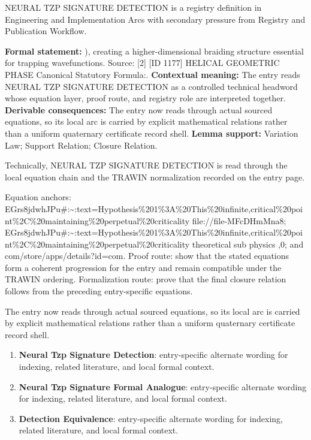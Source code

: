 
\begingroup\small
{}
NEURAL TZP SIGNATURE DETECTION is a registry definition in Engineering and Implementation Arcs with secondary pressure from Registry and Publication Workflow.

\begingroup\footnotesize\setlength{\emergencystretch}{3em}\sloppy
\textbf{Formal statement:} ), creating a higher-dimensional braiding structure essential for trapping wavefunctions. Source: [2] [ID 1177] HELICAL GEOMETRIC PHASE Canonical Statutory Formula:. \textbf{Contextual meaning:} The entry reads NEURAL TZP SIGNATURE DETECTION as a controlled technical headword whose equation layer, proof route, and registry role are interpreted together. \textbf{Derivable consequences:} The entry now reads through actual sourced equations, so its local arc is carried by explicit mathematical relations rather than a uniform quaternary certificate record shell. \textbf{Lemma support:} Variation Law; Support Relation; Closure Relation.\par
\endgroup

Technically, NEURAL TZP SIGNATURE DETECTION is read through the local equation chain and the TRAWIN normalization recorded on the entry page.

Equation anchors: EGrs8jdwhJPu\#:\textasciitilde{}:text=Hypothesis\%201\%3A\%20This\%20infinite,critical\%20point\%2C\%20maintaining\%20perpetual\%20criticality file://file-MFcDHmMna8; EGrs8jdwhJPu\#:\textasciitilde{}:text=Hypothesis\%201\%3A\%20This\%20infinite,critical\%20point\%2C\%20maintaining\%20perpetual\%20criticality theoretical sub physics ,0; and com/store/apps/details?id=com. Proof route: show that the stated equations form a coherent progression for the entry and remain compatible under the TRAWIN ordering. Formalization route: prove that the final closure relation follows from the preceding entry-specific equations.

The entry now reads through actual sourced equations, so its local arc is carried by explicit mathematical relations rather than a uniform quaternary certificate record shell.
\endgroup

\begin{enumerate}[leftmargin=1.6em,itemsep=6pt,topsep=4pt]
\item \textbf{Neural Tzp Signature Detection}: entry-specific alternate wording for indexing, related literature, and local formal context.
\item \textbf{Neural Tzp Signature Formal Analogue}: entry-specific alternate wording for indexing, related literature, and local formal context.
\item \textbf{Detection Equivalence}: entry-specific alternate wording for indexing, related literature, and local formal context.
\end{enumerate}

